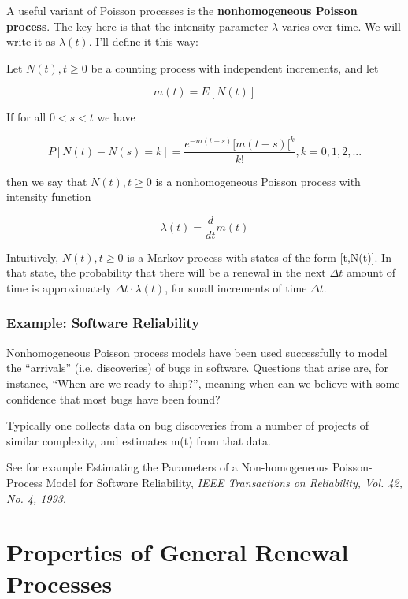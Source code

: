 A useful variant of Poisson processes is the {\bf nonhomogeneous Poisson
process}.  The key here is that the intensity parameter $\lambda$ varies
over time.  We will write it as $\lambda(t)$.  I'll define it this way:

\begin{definition} Let $N(t), t\geq 0$ be a counting process with
independent increments, and let  

\begin{equation}
m(t) = E[N(t)]
\end{equation}

If for all $0 < s < t$ we have

\begin{equation}
P[N(t) - N(s) = k] = \frac{e^{-m(t-s)}[m(t-s)[^k}{k!}, k = 0,1,2,...
\end{equation}

then we say that $N(t), t\geq 0$ is a nonhomogeneous Poisson
process with intensity function

\begin{equation}
\lambda(t) = \frac{d}{dt} m(t)
\end{equation}

\end{definition} 

Intuitively, $N(t), t\geq 0$ is a Markov process with states of the form
[t,N(t)].  In that state, the probability that there will be a renewal
in the next $\Delta t$ amount of time is approximately $\Delta t \cdot
\lambda(t)$, for small increments of time $\Delta t$.

\subsubsection{Example:  Software Reliability}

Nonhomogeneous Poisson process models have been used successfully 
to model the ``arrivals'' (i.e. discoveries) of bugs in software.
Questions that arise are, for instance, ``When are we ready to ship?'',
meaning when can we believe with some confidence that most bugs have
been found?

Typically one collects data on bug discoveries from a number of projects
of similar complexity, and estimates m(t) from that data.

See for example Estimating the Parameters of a Non-homogeneous
Poisson-Process Model for Software Reliability, {\it IEEE Transactions
on Reliability, Vol. 42, No. 4, 1993}.

\section{Properties of General Renewal Processes}
\label{renprops}

